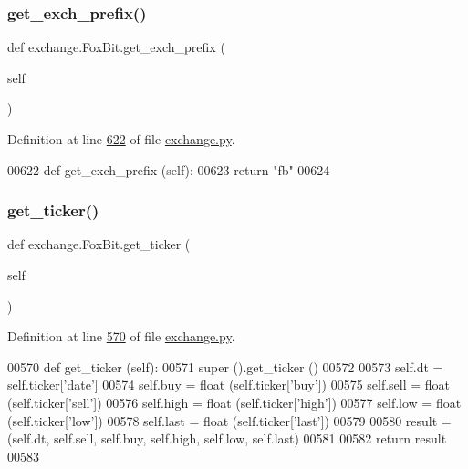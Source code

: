 \subsubsection{\texorpdfstring{get\+\_\+exch\+\_\+prefix()}{get\_exch\_prefix()}}
{\footnotesize\ttfamily def exchange.\+Fox\+Bit.\+get\+\_\+exch\+\_\+prefix (\begin{DoxyParamCaption}\item[{}]{self }\end{DoxyParamCaption})}



Definition at line \hyperlink{exchange_8py_source_l00622}{622} of file \hyperlink{exchange_8py_source}{exchange.\+py}.


\begin{DoxyCode}
00622     \textcolor{keyword}{def }get\_exch\_prefix (self):
00623         \textcolor{keywordflow}{return} \textcolor{stringliteral}{"fb"}
00624         
\end{DoxyCode}
\mbox{\label{classexchange_1_1_fox_bit_aeb98818ddef05bb1beff5b55231d3760}} 
\subsubsection{\texorpdfstring{get\+\_\+ticker()}{get\_ticker()}}
{\footnotesize\ttfamily def exchange.\+Fox\+Bit.\+get\+\_\+ticker (\begin{DoxyParamCaption}\item[{}]{self }\end{DoxyParamCaption})}



Definition at line \hyperlink{exchange_8py_source_l00570}{570} of file \hyperlink{exchange_8py_source}{exchange.\+py}.


\begin{DoxyCode}
00570     \textcolor{keyword}{def }get\_ticker (self):
00571         super ().get\_ticker ()
00572         
00573         self.dt   = self.ticker[\textcolor{stringliteral}{'date'}]
00574         self.buy  = float (self.ticker[\textcolor{stringliteral}{'buy'}])
00575         self.sell = float (self.ticker[\textcolor{stringliteral}{'sell'}])
00576         self.high = float (self.ticker[\textcolor{stringliteral}{'high'}])
00577         self.low  = float (self.ticker[\textcolor{stringliteral}{'low'}])
00578         self.last = float (self.ticker[\textcolor{stringliteral}{'last'}])
00579         
00580         result = (self.dt, self.sell, self.buy, self.high, self.low, self.last)
00581         
00582         \textcolor{keywordflow}{return} result
00583     
\end{DoxyCode}
\mbox{\label{classexchange_1_1_fox_bit_a80807753c2c595997857d097939c9283}} 
